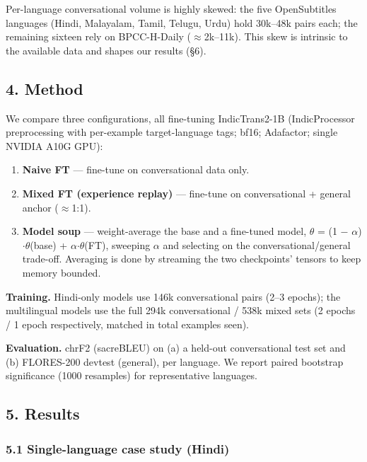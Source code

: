 \documentclass[
  11pt,
]{article}
\providecommand{\tightlist}{%
  \setlength{\itemsep}{0pt}\setlength{\parskip}{0pt}}
\begin{document}
Per-language conversational volume is highly skewed: the five
OpenSubtitles languages (Hindi, Malayalam, Tamil, Telugu, Urdu) hold
30k--48k pairs each; the remaining sixteen rely on BPCC-H-Daily
($\approx$2k--11k). This skew is intrinsic to the available data and shapes our
results (§6).

\hypertarget{method}{%
\subsection{4. Method}\label{method}}

We compare three configurations, all fine-tuning IndicTrans2-1B
(IndicProcessor preprocessing with per-example target-language tags;
bf16; Adafactor; single NVIDIA A10G GPU):

\begin{enumerate}
\def\labelenumi{\arabic{enumi}.}
\tightlist
\item
  \textbf{Naive FT} --- fine-tune on conversational data only.
\item
  \textbf{Mixed FT (experience replay)} --- fine-tune on conversational
  + general anchor ($\approx$1:1).
\item
  \textbf{Model soup} --- weight-average the base and a fine-tuned
  model, $\theta$ = (1 $-$ $\alpha$)$\cdot$$\theta$(base) + $\alpha$$\cdot$$\theta$(FT), sweeping $\alpha$ and selecting on the
  conversational/general trade-off. Averaging is done by streaming the
  two checkpoints' tensors to keep memory bounded.
\end{enumerate}

\textbf{Training.} Hindi-only models use 146k conversational pairs (2--3
epochs); the multilingual models use the full 294k conversational / 538k
mixed sets (2 epochs / 1 epoch respectively, matched in total examples
seen).

\textbf{Evaluation.} chrF2 (sacreBLEU) on (a) a held-out conversational
test set and (b) FLORES-200 devtest (general), per language. We report
paired bootstrap significance (1000 resamples) for representative
languages.

\hypertarget{results}{%
\subsection{5. Results}\label{results}}

\hypertarget{single-language-case-study-hindi}{%
\subsubsection{5.1 Single-language case study
(Hindi)}\label{single-language-case-study-hindi}}
\end{document}
